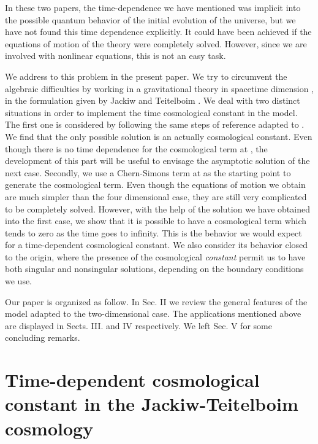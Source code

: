 \documentclass[a4paper,twocolumn,prd,groupedaddress,nofootinbib,showpacs]
{revtex4}
\begin{document}
\medskip
In these two papers, the time-dependence we have mentioned was
implicit into the possible quantum behavior of the initial evolution
of the universe, but we have not found this time dependence
explicitly. It could have been achieved if the equations of motion of
the theory were completely solved. However, since we are involved with
nonlinear equations, this is not an easy task.

\medskip
We address to this problem in the present paper. We try to circumvent
the algebraic difficulties by working in a gravitational theory in
spacetime dimension \coordHE{}, in the formulation given by Jackiw and
Teitelboim \cite{Jackiw}. We deal with two distinct situations in
order to implement the time cosmological constant in the model. The
first one is considered by following the same steps of reference
\cite{Novello2} adapted to \coordHE{}. We find that the only possible
solution is an actually cosmological constant. Even though there is no
time dependence for the cosmological term at \coordHE{}, the development of
this part will be useful to envisage the asymptotic solution of the
next case. Secondly, we use a Chern-Simons \cite{Deser} term at \coordHE{}
\cite{Barcelos} as the starting point to generate the cosmological
term. Even though the equations of motion we obtain are much simpler
than the four dimensional case, they are still very complicated to be
completely solved. However, with the help of the solution we have
obtained into the first case, we show that it is possible to have a
cosmological term which tends to zero as the time goes to infinity.
This is the behavior we would expect for a time-dependent cosmological
constant. We also consider its behavior closed to the origin, where
the presence of the cosmological {\it constant} permit us to have
both singular and nonsingular solutions, depending on the boundary
conditions we use.

\medskip
Our paper is organized as follow. In Sec. II we review the general
features of the model adapted to the two-dimensional case. The
applications mentioned above are displayed in Sects. III. and IV
respectively. We left Sec. V for some concluding remarks.

\section{Time-dependent cosmological constant in the Jackiw-Teitelboim
cosmology}
\renewcommand{\theequation}{2.\arabic{equation}}
\setcounter{equation}{0}
\end{document}
